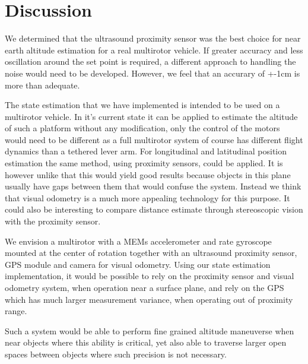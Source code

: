 \section{Discussion}
We determined that the ultrasound proximity sensor was the best choice for near earth altitude estimation for a real multirotor 
vehicle. If greater accuracy and less oscillation around the set point is required, a different approach to handling the noise would
need to be developed. However, we feel that an accurary of +-1cm is more than adequate.

The state estimation that we have implemented is intended to be used on a multirotor vehicle. In it's current state it can be applied
to estimate the altitude of such a platform without any modification, only the control of the motors would need to be different as 
a full multirotor system 
of course has different flight dynamics than a tethered lever arm. For longitudinal and latitudinal position estimation the same method,
using proximity sensors, could be applied. It is however unlike that this would yield good results because objects in this plane usually
have gaps between them that would confuse the system. Instead we think that visual odometry\cite{Nister2004} is a much more
appealing technology for this
purpose. It could also be interesting to compare distance estimate through stereoscopic vision with the proximity sensor.

We envision a multirotor with a MEMs accelerometer and rate gyroscope
mounted at the center of rotation together with an ultrasound proximity sensor, GPS module and camera for visual odometry.
Using our state estimation implementation,
it would be possible to rely on the proximity sensor and visual odometry system, when operation near a surface plane, and rely
on the GPS which has much larger 
measurement variance, when operating out of proximity range.

Such a system would be able to perform fine grained altitude maneuverse when near objects where this ability is critical, yet also able
to traverse larger open spaces between objects where such precision is not necessary.
